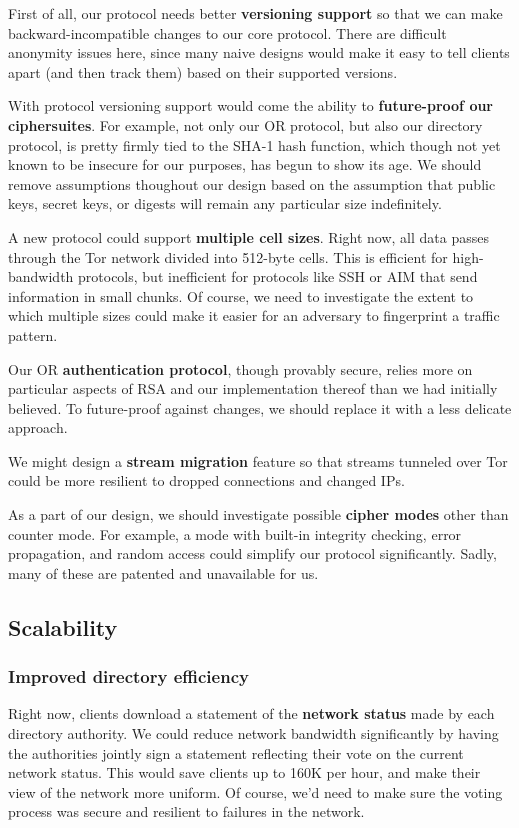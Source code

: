 \documentclass{article}
\begin{document}
First of all, our protocol needs better {\bf versioning support} so that we
can make backward-incompatible changes to our core protocol.  There are
difficult anonymity issues here, since many naive designs would make it easy
to tell clients apart (and then track them) based on their supported versions.

With protocol versioning support would come the ability to {\bf future-proof
  our ciphersuites}.  For example, not only our OR protocol, but also our
directory protocol, is pretty firmly tied to the SHA-1 hash function, which
though not yet known to be insecure for our purposes, has begun to show
its age.  We should
remove assumptions thoughout our design based on the assumption that public
keys, secret keys, or digests will remain any particular size indefinitely.

A new protocol could support {\bf multiple cell sizes}.  Right now, all data
passes through the Tor network divided into 512-byte cells.  This is
efficient for high-bandwidth protocols, but inefficient for protocols
like SSH or AIM that send information in small chunks.  Of course, we need to
investigate the extent to which multiple sizes could make it easier for an
adversary to fingerprint a traffic pattern.

Our OR {\bf authentication protocol}, though provably
secure\cite{tap:pet2006}, relies more on particular aspects of RSA and our
implementation thereof than we had initially believed.  To future-proof
against changes, we should replace it with a less delicate approach.

We might design a {\bf stream migration} feature so that streams tunneled
over Tor could be more resilient to dropped connections and changed IPs.

As a part of our design, we should investigate possible {\bf cipher modes}
other than counter mode.  For example, a mode with built-in integrity
checking, error propagation, and random access could simplify our protocol
significantly.  Sadly, many of these are patented and unavailable for us.


\subsection{Scalability}

\subsubsection{Improved directory efficiency}
Right now, clients download a statement of the {\bf network status} made by
each directory authority.  We could reduce network bandwidth significantly by
having the authorities jointly sign a statement reflecting their vote on the
current network status.  This would save clients up to 160K per hour, and
make their view of the network more uniform.  Of course, we'd need to make
sure the voting process was secure and resilient to failures in the network.
\end{document}
